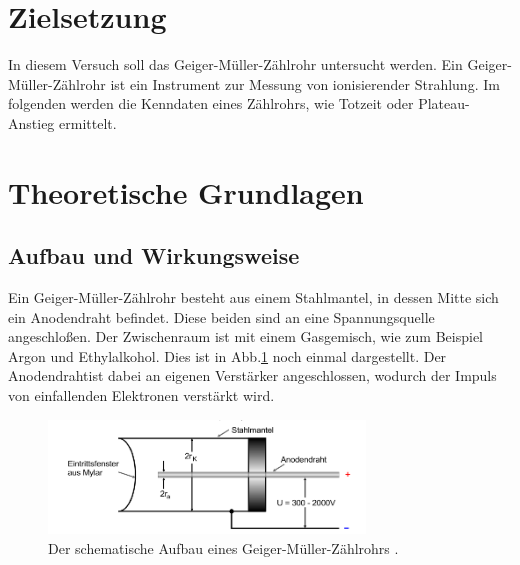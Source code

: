 \section{Zielsetzung}
In diesem Versuch soll das Geiger-Müller-Zählrohr untersucht werden.
Ein Geiger-Müller-Zählrohr ist ein Instrument zur Messung von ionisierender Strahlung.
Im folgenden werden die Kenndaten eines Zählrohrs, wie Totzeit oder Plateau-Anstieg ermittelt.



\section{Theoretische Grundlagen}
\subsection{Aufbau und Wirkungsweise}

\noindent
Ein Geiger-Müller-Zählrohr besteht aus einem Stahlmantel, in dessen Mitte sich ein Anodendraht befindet. Diese beiden sind an eine Spannungsquelle angeschloßen.
Der Zwischenraum ist mit einem Gasgemisch, wie zum Beispiel Argon und Ethylalkohol. Dies ist in Abb.\ref{img:aufbau} noch einmal dargestellt. Der Anodendrahtist dabei an eigenen
Verstärker angeschlossen, wodurch der Impuls von einfallenden Elektronen verstärkt wird.

\begin{figure}[H]
    \centering
    \includegraphics[width=0.75\textwidth]{images/Aufbau.PNG}
    \caption{Der schematische Aufbau eines Geiger-Müller-Zählrohrs \protect \cite{V703}.}
    \label{img:aufbau}
\end{figure}

